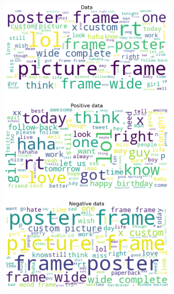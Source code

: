 \documentclass{article}
\begin{document}
\begin{itemize}
\begin{figure}[H]
\begin{subfigure}[b]{0.24\textwidth}
\includegraphics[width=\textwidth]{chapter-06/section-01-01/06/visualization/3/wordcloud.png}
\end{subfigure}
\begin{subfigure}[b]{0.24\textwidth}
\centering

\end{subfigure}
\end{figure}
\end{itemize}
\end{document}
